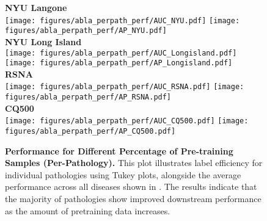 \begin{figure}
    \centering
    \textbf{NYU Langone} \\
    \texttt{[image: figures/abla\_perpath\_perf/AUC\_NYU.pdf]}
    \texttt{[image: figures/abla\_perpath\_perf/AP\_NYU.pdf]} \\
    \textbf{NYU Long Island} \\
    \texttt{[image: figures/abla\_perpath\_perf/AUC\_Longisland.pdf]}
    \texttt{[image: figures/abla\_perpath\_perf/AP\_Longisland.pdf]} \\
    \textbf{RSNA} \\
    \texttt{[image: figures/abla\_perpath\_perf/AUC\_RSNA.pdf]}
    \texttt{[image: figures/abla\_perpath\_perf/AP\_RSNA.pdf]}\\
    \textbf{CQ500} \\
    \texttt{[image: figures/abla\_perpath\_perf/AUC\_CQ500.pdf]}
    \texttt{[image: figures/abla\_perpath\_perf/AP\_CQ500.pdf]}
    \caption{\textbf{Performance for Different Percentage of Pre-training Samples (Per-Pathology).} This plot illustrates label efficiency for individual pathologies using Tukey plots, alongside the average performance across all diseases shown in . The results indicate that the majority of pathologies show improved downstream performance as the amount of pretraining data increases.}
    \label{fig:boxplot_scaling}
\end{figure}
